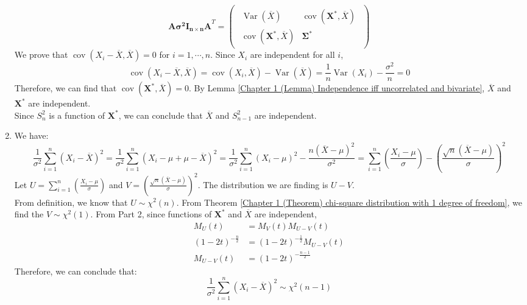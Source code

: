 \documentclass{huhtakm-template-book-v2}
\DeclareMathOperator{\Var}{Var}
\DeclareMathOperator{\cov}{cov}
\begin{document}
\begin{proofing}
\begin{enumerate}
		\begin{equation*}
			\mathbf{A\sigma^{2}I_{n\times n}A}^{T}=\begin{pmatrix}\begin{array}{c|c}
				\Var(\overline{X}) & \cov(\mathbf{X^{*}},\overline{X})\\
				\hline
				\cov(\mathbf{X^{*}},\overline{X}) & \mathbf{\Sigma^{*}}
			\end{array}\end{pmatrix}
		\end{equation*}
		We prove that $\cov(X_{i}-\overline{X},\overline{X})=0$ for $i=1,\cdots,n$. Since $X_{i}$ are independent for all $i$,
		\begin{equation*}
			\cov(X_{i}-\overline{X},\overline{X})=\cov(X_{i},\overline{X})-\Var(\overline{X})=\frac{1}{n}\Var(X_{i})-\frac{\sigma^{2}}{n}=0
		\end{equation*}
		Therefore, we can find that $\cov(\mathbf{X^{*}},\overline{X})=0$. By Lemma \ref{Chapter 1 (Lemma) Independence iff uncorrelated and bivariate}, $\overline{X}$ and $\mathbf{X^{*}}$ are independent.\\
		Since $S_{n}^{2}$ is a function of $\mathbf{X^{*}}$, we can conclude that $\overline{X}$ and $S_{n-1}^{2}$ are independent.
		\newpage
		\item We have:
		\begin{equation*}
			\frac{1}{\sigma^{2}}\sum_{i=1}^{n}(X_{i}-\overline{X})^{2}=\frac{1}{\sigma^{2}}\sum_{i=1}^{n}(X_{i}-\mu+\mu-\overline{X})^{2}=\frac{1}{\sigma^{2}}\sum_{i=1}^{n}(X_{i}-\mu)^{2}-\frac{n(\overline{X}-\mu)^{2}}{\sigma^{2}}=\sum_{i=1}^{n}\left(\frac{X_{i}-\mu}{\sigma}\right)-\left(\frac{\sqrt{n}(\overline{X}-\mu)}{\sigma}\right)^{2}
		\end{equation*}
		Let $U=\sum_{i=1}^{n}\left(\frac{X_{i}-\mu}{\sigma}\right)$ and $V=\left(\frac{\sqrt{n}(\overline{X}-\mu)}{\sigma}\right)^{2}$. The distribution we are finding is $U-V$.\\
		From definition, we know that $U\sim\chi^{2}(n)$. From Theorem \ref{Chapter 1 (Theorem) chi-square distribution with 1 degree of freedom}, we find the $V\sim\chi^{2}(1)$. From Part 2, since functions of $\mathbf{X}^{*}$ and $\overline{X}$ are independent, 
		\begin{align*}
			M_{U}(t)&=M_{V}(t)M_{U-V}(t)\\
			(1-2t)^{-\frac{n}{2}}&=(1-2t)^{-\frac{1}{2}}M_{U-V}(t)\\
			M_{U-V}(t)&=(1-2t)^{-\frac{n-1}{2}}
		\end{align*}
		Therefore, we can conclude that:
		\begin{equation*}
			\frac{1}{\sigma^{2}}\sum_{i=1}^{n}(X_{i}-\overline{X})^{2}\sim\chi^{2}(n-1)
		\end{equation*}
	\end{enumerate}
\end{proofing}
\end{document}
